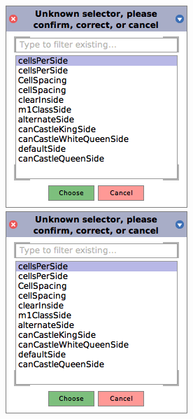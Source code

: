 \documentclass[a4paper,10pt,twoside]{book}
\begin{document}
\begin{figure}[htb]
\begin{minipage}{0.34\textwidth}
	\centering
	\ifluluelse
		{\includegraphics[width=\textwidth]{UnknownSelector}}
		{\includegraphics[scale=0.7]{UnknownSelector}}

\end{minipage}
\end{figure}
\end{document}
